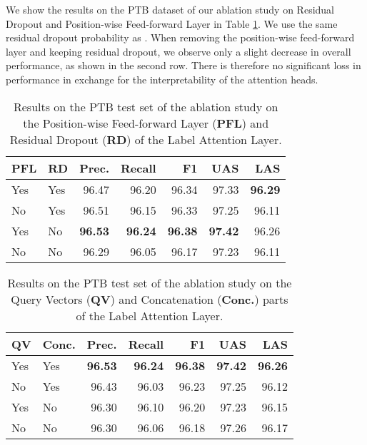 \documentclass[11pt,a4paper]{article}
\begin{document}
We show the results on the PTB dataset of our ablation study on Residual Dropout and Position-wise Feed-forward Layer in Table \ref{exp2}. We use the same residual dropout probability as \citet{zhou2019head}. When removing the position-wise feed-forward layer and keeping residual dropout, we observe only a slight decrease in overall performance, as shown in the second row. There is therefore no significant loss in performance in exchange for the interpretability of the attention heads.

\begin{table}[]
    \centering
     \small
    \begin{tabular}{|l|l|r|r|r|r|r|}
        \hline
        \bf PFL & \bf RD  & \bf Prec. & \bf Recall & \bf F1 & \bf UAS & \bf LAS \\ \hline
        Yes & Yes & 96.47 & 96.20 & 96.34 & 97.33 & \bf 96.29 \\
        No & Yes & 96.51 & 96.15 & 96.33 & 97.25 & 96.11 \\
        Yes & No & \bf 96.53 & \bf 96.24 & \bf 96.38 & \bf 97.42 & 96.26 \\
        No & No & 96.29 & 96.05 & 96.17 & 97.23 & 96.11 \\ \hline
    \end{tabular}
    \caption{Results on the PTB test set of the ablation study on the Position-wise Feed-forward Layer (\textbf{PFL}) and Residual Dropout (\textbf{RD}) of the Label Attention Layer.}
    \label{exp2}
\end{table}

\begin{table}[]
    \centering
     \small
    \begin{tabular}{|l|l|r|r|r|r|r|}
        \hline
        \bf QV & \bf Conc. & \bf Prec. & \bf Recall & \bf F1 & \bf UAS & \bf LAS \\ \hline
        Yes & Yes & \bf 96.53 & \bf 96.24 & \bf 96.38 & \bf 97.42 & \bf 96.26 \\
        No & Yes & 96.43 & 96.03 & 96.23 & 97.25 & 96.12 \\ Yes & No & 96.30 & 96.10 & 96.20 & 97.23 & 96.15 \\ No & No & 96.30 & 96.06 & 96.18 & 97.26 & 96.17 \\ \hline
    \end{tabular}
    \caption{Results on the PTB test set of the ablation study on the Query Vectors (\textbf{QV}) and Concatenation (\textbf{Conc.}) parts of the Label Attention Layer.}
    \label{exp4}
\end{table}
\end{document}
